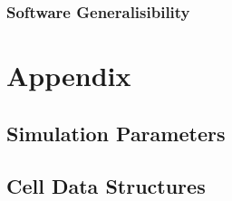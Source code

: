 \documentclass{UoYCSproject}
\begin{document}
\subsection{Software Generalisibility}%


\printbibliography

\chapter{Appendix}
\section{Simulation Parameters}


\section{Cell Data Structures}
 
\end{document}
